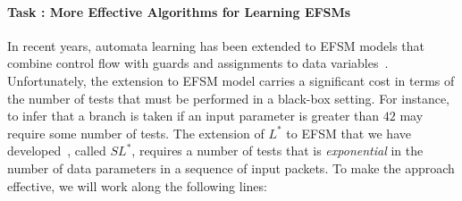 \documentclass[11pt]{article}
\newcounter{Task}
\newcommand{\task}[1]{\addtocounter{Task}{1}\paragraph{Task \theTask: #1}}
\newcommand{\myparagraph}{}
\let\myparagraph=\paragraph
\renewcommand{\paragraph}{\vspace{-3mm}\myparagraph}
\begin{document}
\task{More Effective Algorithms for Learning EFSMs}
In recent years, automata learning has been extended to EFSM models that
combine control flow with guards and assignments to data
variables~\cite{CasselHJS16,AJUV15}.
Unfortunately, the extension to EFSM model carries a significant cost in terms
of the number of tests that must be performed in a black-box setting. For
instance, to infer that a branch is taken if an input parameter is greater
than $42$ may require some number of tests. The extension of $L^*$ to EFSM
that we have developed~\cite{CasselHJS16}, called $SL^*$, requires a number of
tests that is \emph{exponential} in the number of data parameters in a
sequence of input packets. To make the approach effective, we will work along
the following lines:
\end{document}
